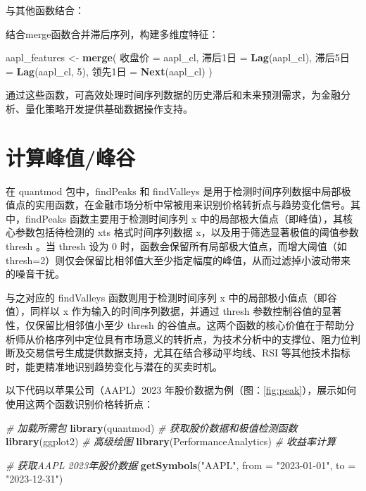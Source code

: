 \documentclass[]{ctexbook}
\newenvironment{Shaded}{\begin{snugshade}}{\end{snugshade}}
\newcommand{\AttributeTok}[1]{\textcolor[rgb]{0.13,0.29,0.53}{#1}}
\newcommand{\CommentTok}[1]{\textcolor[rgb]{0.56,0.35,0.01}{\textit{#1}}}
\newcommand{\DecValTok}[1]{\textcolor[rgb]{0.00,0.00,0.81}{#1}}
\newcommand{\FunctionTok}[1]{\textcolor[rgb]{0.13,0.29,0.53}{\textbf{#1}}}
\newcommand{\NormalTok}[1]{#1}
\newcommand{\OtherTok}[1]{\textcolor[rgb]{0.56,0.35,0.01}{#1}}
\newcommand{\StringTok}[1]{\textcolor[rgb]{0.31,0.60,0.02}{#1}}
\begin{document}
与其他函数结合：

结合merge函数合并滞后序列，构建多维度特征：

\begin{Shaded}
\begin{Highlighting}[]
\NormalTok{aapl\_features }\OtherTok{\textless{}{-}} \FunctionTok{merge}\NormalTok{(}
\NormalTok{  收盘价 }\OtherTok{=}\NormalTok{ aapl\_cl,}
\NormalTok{  滞后1日 }\OtherTok{=} \FunctionTok{Lag}\NormalTok{(aapl\_cl),}
\NormalTok{  滞后5日 }\OtherTok{=} \FunctionTok{Lag}\NormalTok{(aapl\_cl, }\DecValTok{5}\NormalTok{),}
\NormalTok{  领先1日 }\OtherTok{=} \FunctionTok{Next}\NormalTok{(aapl\_cl)}
\NormalTok{)}
\end{Highlighting}
\end{Shaded}

通过这些函数，可高效处理时间序列数据的历史滞后和未来预测需求，为金融分析、量化策略开发提供基础数据操作支持。

\section{计算峰值/峰谷}\label{ux8ba1ux7b97ux5cf0ux503cux5cf0ux8c37}

在 quantmod 包中，findPeaks 和 findValleys
是用于检测时间序列数据中局部极值点的实用函数，在金融市场分析中常被用来识别价格转折点与趋势变化信号。其中，findPeaks 函数主要用于检测时间序列 x 中的局部极大值点（即峰值），其核心参数包括待检测的 xts 格式时间序列数据 x，以及用于筛选显著极值的阈值参数 thresh 。当 thresh 设为 0 时，函数会保留所有局部极大值点，而增大阈值（如 thresh=2）则仅会保留比相邻值大至少指定幅度的峰值，从而过滤掉小波动带来的噪音干扰。

与之对应的 findValleys 函数则用于检测时间序列 x 中的局部极小值点（即谷值），同样以 x 作为输入的时间序列数据，并通过 thresh 参数控制谷值的显著性，仅保留比相邻值小至少 thresh 的谷值点。这两个函数的核心价值在于帮助分析师从价格序列中定位具有市场意义的转折点，为技术分析中的支撑位、阻力位判断及交易信号生成提供数据支持，尤其在结合移动平均线、RSI 等其他技术指标时，能更精准地识别趋势变化与潜在的买卖时机。

以下代码以苹果公司（AAPL）2023 年股价数据为例（图：\ref{fig:peak}），展示如何使用这两个函数识别价格转折点：

\begin{Shaded}
\begin{Highlighting}[]
\CommentTok{\# 加载所需包}
\FunctionTok{library}\NormalTok{(quantmod)      }\CommentTok{\# 获取股价数据和极值检测函数}
\FunctionTok{library}\NormalTok{(ggplot2)       }\CommentTok{\# 高级绘图}
\FunctionTok{library}\NormalTok{(PerformanceAnalytics) }\CommentTok{\# 收益率计算}

\CommentTok{\# 获取AAPL 2023年股价数据}
\FunctionTok{getSymbols}\NormalTok{(}\StringTok{"AAPL"}\NormalTok{, }\AttributeTok{from =} \StringTok{"2023{-}01{-}01"}\NormalTok{, }\AttributeTok{to =} \StringTok{"2023{-}12{-}31"}\NormalTok{)}
\end{Highlighting}
\end{Shaded}
\end{document}
